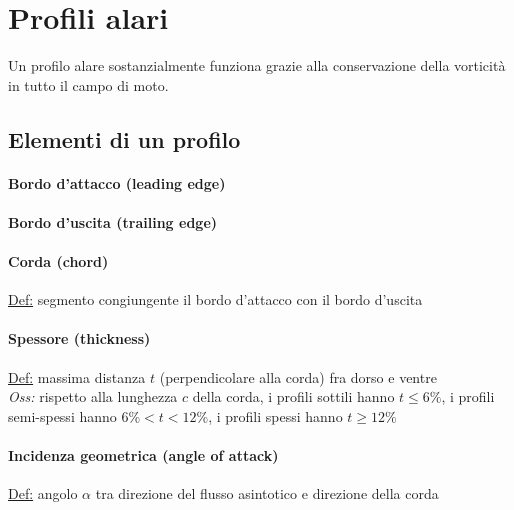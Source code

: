 \documentclass[11pt,a4paper]{report}
\begin{document}

\chapter{Profili alari}
Un profilo alare sostanzialmente funziona grazie alla conservazione della vorticità in tutto il campo di moto.
	\section{Elementi di un profilo}	\label{elem prof}	
			\subsubsection{Bordo d'attacco (leading edge)}
			\subsubsection{Bordo d'uscita (trailing edge)}
			\subsubsection{Corda (chord)}
			\underline{Def:} segmento congiungente il bordo d'attacco con il bordo d'uscita
			\subsubsection{Spessore (thickness)}
			\underline{Def:} massima distanza $t$ (perpendicolare alla corda) fra dorso e ventre\\
			\textit{Oss:} rispetto alla lunghezza $c$ della corda, i profili sottili hanno $t\leq 6\%$, i profili semi-spessi hanno $6\%<t<12\%$, i profili spessi hanno $t\geq 12\%$
			\subsubsection{Incidenza geometrica (angle of attack)}
			\underline{Def:} angolo $\alpha$ tra direzione del flusso asintotico e direzione della corda
\end{document}
